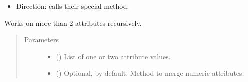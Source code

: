 \documentclass[letterpaper,10pt,english]{sphinxmanual}
\begin{document}
\begin{fulllineitems}
\begin{fulllineitems}
\begin{itemize}
\item {} 
Direction: calls their special
{\hyperref[\detokenize{main:pypath.main.Direction.merge}]{}} method.

\end{itemize}

Works on more than 2 attributes recursively.
\begin{quote}\begin{description}
\item[{Parameters}] \leavevmode\begin{itemize}
\item {} 
 () \textendash{} List of one or two attribute values.

\item {} 
 () \textendash{} Optional,  by default. Method to merge numeric
attributes.

\end{itemize}

\end{description}\end{quote}

\end{fulllineitems}


\begin{fulllineitems}
\label{\detokenize{main:pypath.main.PyPath.communities}}
\end{fulllineitems}


\begin{fulllineitems}
\label{\detokenize{main:pypath.main.PyPath.complex_comembership_network}}
\end{fulllineitems}


\begin{fulllineitems}
\label{\detokenize{main:pypath.main.PyPath.complexes}}
\end{fulllineitems}


\end{fulllineitems}
\end{document}
